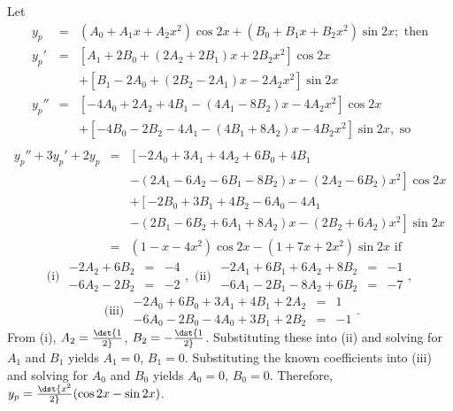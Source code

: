 \documentclass[dvips]{book}
\renewcommand{\exer}[1]{\par\medskip\;\noindent{\color{red}\bf #1.}}
\numberwithin{example}{section}
\numberwithin{equation}{section}
\numberwithin{theorem}{section}
\numberwithin{table}{section}
\numberwithin{figure}{section}
\begin{document}
\exer{5.5.14}
Let
\begin{eqnarray*}
y_p&=&(A_0+A_1x+A_2x^2)\cos2x +(B_0+B_1x+B_2x^2)\sin2x;\mbox{ then}\\
y_p'&=&\left[A_1+2B_0+(2A_2+2B_1)x+2B_2x^2\right]\cos2x\\ &&
+\left[B_1-2A_0+(2B_2-2A_1)x-2A_2x^2\right]\sin2x\\
y_p''&=&\left[-4A_0+2A_2+4B_1 -(4A_1-8B_2)x-4A_2x^2\right]\cos2x\\
&&+ \left[-4B_0-2B_2-4A_1
-(4B_1+8A_2)x-4B_2x^2\right]\sin2x,\mbox{ so}\\
\end{eqnarray*}
\begin{eqnarray*}
y_p''+3y_p'+2y_p&=&\left[-2A_0+3A_1+4A_2+6B_0+4B_1\right.\\ &&\left.
-(2A_1-6A_2-6B_1-8B_2)x-
(2A_2-6B_2)x^2\right]\cos2x\\ &&
+\left[-2B_0+3B_1+4B_2-6A_0-4A_1\right.\\ &&\left.
-(2B_1-6B_2+6A_1+8A_2)x-(2B_2+6A_2)x^2\right]\sin2x\\
&=&(1-x-4x^2)\cos2x-(1+7x+2x^2)\sin2x \mbox{ if}
\end{eqnarray*}
$$
\mbox{(i) } \begin{array}{rcl}-2A_2+6B_2&=&-4
\\-6A_2-2B_2&=&-2\end{array},
\mbox{ (ii) } \begin{array}{rcr} -2A_1+6B_1+6A_2+8B_2&=&-1
\\-6A_1-2B_1-8A_2+6B_2&=&-7\end{array},
$$
$$
\mbox{ (iii) }
\begin{array}{rcr}-2A_0+6B_0+3A_1+4B_1+2A_2&=&1
\\-6A_0-2B_0-4A_0+3B_1+2B_2&=&-1\end{array}.
$$
From (i), $A_2=\dst{1\over2}$, $B_2=-\dst{1\over2}$. Substituting
these into (ii) and solving for $A_1$ and $B_1$ yields $A_1=0$,
$B_1=0$. Substituting the known coefficients into (iii) and solving
for $A_0$ and $B_0$ yields $A_0=0$, $B_0=0$. Therefore,
$y_p=\dst{x^2\over2}(\cos2x-\sin2x)$.
\end{document}
